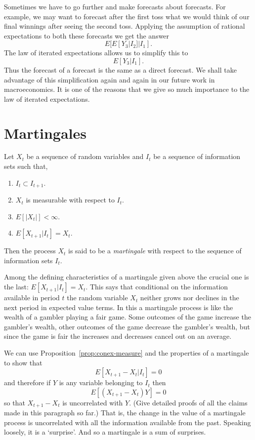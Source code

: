 \documentclass[11pt,reqno,openany]{amsbook}
\theoremstyle{plain}
\theoremstyle{definition}
\newcommand{\newterm}[1]{\emph{#1}}
\begin{document}
Sometimes we have to go further and make forecasts about forecasts.
For example, we may want to forecast after the first toss what we
would think of our final winnings after seeing the second toss.
Applying the assumption of rational expectations to both these
forecasts we get the answer
\[E[E[Y_3|I_2]|I_1].\]
The law of iterated expectations allows us to simplify this to
\[E[Y_3|I_1].\]
Thus the forecast of a forecast is the same as a direct forecast. We
shall take advantage of this simplification again and again in our
future work in macroeconomics. It is one of the reasons that we give
so much importance to the law of iterated expectations.

\section{Martingales}
Let $X_t$ be a sequence of random variables and $I_t$ be a sequence of
information sets such that,
\begin{enumerate}
\item $I_t \subset I_{t+1}$.
\item $X_t$ is measurable with respect to $I_t$.
\item $E[|X_t|]<\infty$.
\item $E[X_{t+1}|I_t]=X_t$.
\end{enumerate}
Then the process $X_t$ is said to be a \newterm{martingale} with
respect to the sequence of information sets $I_t$.

Among the defining characteristics of a martingale given above the
crucial one is the last: $E[X_{t+1}|I_t]=X_t$. This says that
conditional on the information available in period $t$ the random
variable $X_t$ neither grows nor declines in the next period in
expected value terms. In this a martingale process is like the wealth
of a gambler playing a fair game. Some outcomes of the game increase
the gambler's wealth, other outcomes of the game decrease the
gambler's wealth, but since the game is fair the increases and
decreases cancel out on an average.

We can use Proposition~\ref{prop:conex-measure} and the properties of
a martingale to show that
\[E[X_{t+1}-X_t|I_t]=0\]
and therefore if $Y$ is any variable belonging to $I_t$ then
\[E[(X_{t+1}-X_{t})Y]=0\]
so that $X_{t+1}-X_t$ is uncorrelated with $Y$. (Give detailed proofs
of all the claims made in this paragraph so far.) That is, the change
in the value of a martingale process is uncorrelated with all the
information available from the past. Speaking loosely, it is a
`surprise'. And so a martingale is a sum of surprises.
\end{document}

